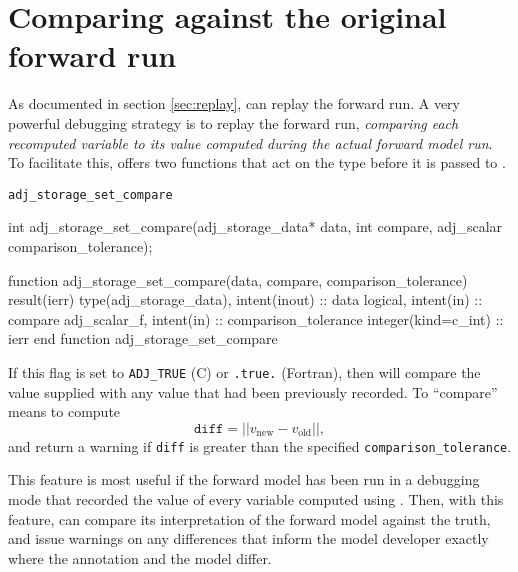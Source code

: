 \section{Comparing against the original forward run} \label{sec:compare}
As documented in section \autoref{sec:replay}, \libadjoint can replay the forward
run. A very powerful debugging strategy is to replay the forward run, \emph{comparing
each recomputed variable to its value computed during the actual forward model run}.
To facilitate this, \libadjoint offers two functions that act on the 
type before it is passed to .
\begin{boxwithtitle}{\texttt{adj_storage_set_compare}}
\begin{minipage}{\columnwidth}
\begin{ccode}
  int adj_storage_set_compare(adj_storage_data* data, int compare, 
                              adj_scalar comparison_tolerance);
\end{ccode}
\begin{fortrancode}
  function adj_storage_set_compare(data, compare, comparison_tolerance)
           result(ierr)
    type(adj_storage_data), intent(inout) :: data
    logical, intent(in) :: compare
    adj_scalar_f, intent(in) :: comparison_tolerance
    integer(kind=c_int) :: ierr
  end function adj_storage_set_compare
\end{fortrancode}
\end{minipage}
\end{boxwithtitle}
If this flag is set to \texttt{ADJ_TRUE} (C) or \texttt{.true.} (Fortran),
then  will compare the value supplied with any value
that had been previously recorded. To ``compare'' means to compute
\begin{equation*}
\texttt{diff} = \left|\left| v_{\textrm{new}} - v_{\textrm{old}} \right|\right|,
\end{equation*}
and return a warning  if \texttt{diff} is greater
than the specified \texttt{comparison_tolerance}.

This feature is most useful if the forward model has been run in a debugging mode that
recorded the value of every variable computed using . Then,
with this feature, \libadjoint can compare its interpretation of the forward model against
the truth, and issue warnings on any differences that inform the model developer exactly
where the annotation and the model differ.

